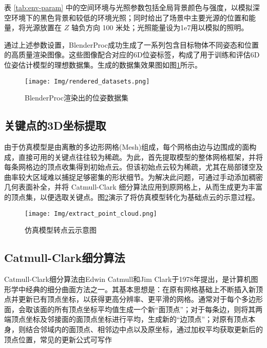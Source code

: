 表 \ref{tab:env-param} 中的空间环境与光照参数包括全局背景颜色与强度，以模拟深空环境下的黑色背景和较低的环境光照；同时给出了场景中主要光源的位置和能量，将光源放置在 $Z$ 轴负方向 100 米处；光照能量设为1e7用以模拟的照明。

通过上述参数设置，BlenderProc成功生成了一系列包含目标物体不同姿态和位置的高质量渲染图像。这些图像配合对应的6D位姿标签，构成了用于训练和评估6D位姿估计模型的理想数据集。生成的数据集效果图如图\ref{fig:rendered_datasets}所示。

\begin{figure}[htbp]
	\centering
	\texttt{[image: Img/rendered\_datasets.png]}
	\caption{BlenderProc渲染出的位姿数据集}
	\label{fig:rendered_datasets}
	\vspace{-3ex}
\end{figure}

\subsection{关键点的3D坐标提取}

由于仿真模型是由离散的多边形网格(Mesh)组成，每个网格由边与边围成的面构成，直接可用的关键点往往较为稀疏。为此，首先提取模型的整体网格框架，并将每条网格边的顶点收集得到初始点云。但该初始点云较为稀疏，尤其在局部镂空及曲率较大区域难以捕捉足够密集的形状细节。为解决此问题，可通过手动添加稠密几何表面补全，并将 Catmull-Clark 细分算法应用到原网格上，从而生成更为丰富的顶点集，以便选取关键点。图\ref{fig:model2pointcloud}演示了将仿真模型转化为基础点云的示意过程。

\begin{figure}[htbp]
	\centering
	\texttt{[image: Img/extract\_point\_cloud.png]}
	\caption{仿真模型转点云示意图}
	\label{fig:model2pointcloud}
	\vspace{-3ex}
\end{figure}

\subsection{Catmull-Clark细分算法}

Catmull-Clark细分算法由Edwin Catmull和Jim Clark于1978年提出，是计算机图形学中经典的细分曲面方法之一。其基本思想是：在原有网格基础上不断插入新顶点并更新已有顶点坐标，以获得更高分辨率、更平滑的网格。通常对于每个多边形面，会取该面的所有顶点坐标平均值生成一个新“面顶点”；对于每条边，则将其两端顶点坐标及邻接面的面顶点坐标进行平均，生成新的“边顶点”；对原有顶点本身，则结合邻域内的面顶点、相邻边中点以及原坐标，通过加权平均获取更新后的顶点位置，常见的更新公式可写作

